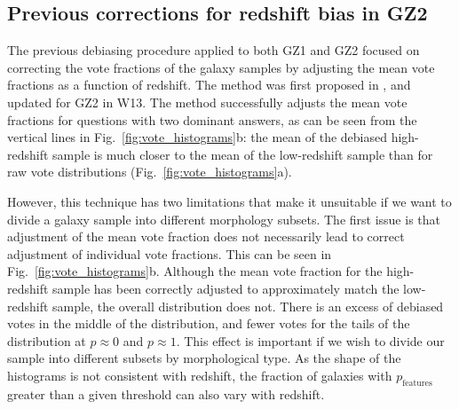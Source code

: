 \documentclass[useAMS,usenatbib]{mn2e}
\begin{document}
\subsection{Previous corrections for redshift bias in GZ2}
\label{sec:previous_method}

The previous debiasing procedure applied to both GZ1 and GZ2 focused on correcting the vote fractions of the galaxy samples by adjusting the mean vote fractions as a function of redshift. The method was first proposed in \cite{Bamford_09}, and updated for GZ2 in W13. The method successfully adjusts the mean vote fractions for questions with two dominant answers, as can be seen from the vertical lines in Fig.~\ref{fig:vote_histograms}b: the mean of the debiased high-redshift sample is much closer to the mean of the low-redshift sample than for raw vote distributions (Fig.~\ref{fig:vote_histograms}a).

However, this technique has two limitations that make it unsuitable if we want to divide a galaxy sample into different morphology subsets.  The first issue is that adjustment of the mean vote fraction does not necessarily lead to correct adjustment of individual vote fractions. This can be seen in Fig.~\ref{fig:vote_histograms}b.  Although the mean vote fraction for the high-redshift sample has been correctly adjusted to approximately match the low-redshift sample, the overall distribution does not. There is an excess of debiased votes in the middle of the distribution, and fewer votes for the tails of the distribution at $p \approx 0$ and $p \approx 1$. This effect is important if we wish to divide our sample into different subsets by morphological type. As the shape of the histograms is not consistent with redshift, the fraction of galaxies with $p_\mathrm{features}$ greater than a given threshold can also vary with redshift. 
\end{document}
